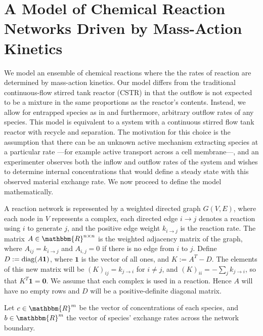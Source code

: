 \documentclass[smallextended]{svjour3}       %
\newcounter{sent}
\newcommand*{\diag}{\mbox{\rm diag}}
\newcommand*{\0}{\mathbf{0}}
\newcommand*{\1}{\mathbf{1}}
\newcommand*{\R}{\mathbbm{R}}
\begin{document}
\section{A Model of Chemical Reaction Networks Driven by Mass-Action Kinetics}
\label{section:crnt-model} 
We model an ensemble of chemical reactions where the the rates of reaction are
determined by mass-action kinetics. Our model differs from the traditional continuous-flow
stirred tank reactor (CSTR) in that the outflow is not expected to be a
mixture in the same proportions as the reactor's contents. Instead, we allow
for entrapped species as in \cite{feinberg-entrapped} and furthermore,
arbitrary outflow rates of any species. This model is equivalent to a system
with a continuous stirred flow tank reactor with recycle and separation.  The
motivation for this choice is the assumption that there can be an unknown
active mechanism extracting species at a particular rate ---for example active
transport across a cell membrane---, and an experimenter observes both the
inflow and outflow rates of the system and wishes to determine internal
concentrations that would define a steady state with this observed material
exchange rate. We now proceed to define the model mathematically.

A reaction network is represented by a weighted directed graph $G(V,E)$, where
each node in $V$ represents a complex, each directed edge $i\rightarrow j$
denotes a reaction using $i$ to generate $j$, and the positive edge weight
$k_{i\rightarrow j}$ is the reaction rate. The matrix $A \in \R^{n \times n}$
is the weighted adjacency matrix of the graph, where $A_{ij}=k_{i\rightarrow
j}$ and $A_{i,j} =0$ if there is no edge from $i$ to $j$.  Define $D :=
\diag(A\1)$, where $\1$ is the vector of all ones, and $K := A^T-D$.  The
elements of this new matrix will be $(K)_{ij} = k_{j \rightarrow i}$ for $i
\neq j$, and $(K)_{ii} = -\sum_j k_{j \rightarrow i}$, so that $K^T \1 = \0$.
We assume that each complex is used in a reaction. Hence $A$ will have no empty
rows and $D$ will be a positive-definite diagonal matrix.

Let $c \in \R^m$ be the vector of concentrations of each species, and $b \in
\R^m$ the vector of species' exchange rates across the network boundary.
\end{document}
